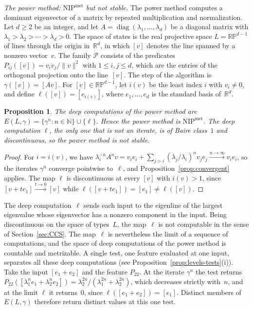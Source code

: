 \documentclass[psamsfonts]{amsart}
\newtheorem{prop}[thm]{Proposition}
\theoremstyle{definition}
\theoremstyle{remark}
\newcommand{\NIP}{\text{NIP}}
\newcommand{\RP}{\mathbb{R}\mathbb{P}}
\numberwithin{equation}{section}
\begin{document}
\emph{The power method: $\NIP^{\mathrm{met}}$ but not stable.}
The power method computes a dominant eigenvector of a matrix by repeated multiplication and normalization.
Let $d\ge2$ be an integer, and let $A=\operatorname{diag}(\lambda_1,\dots,\lambda_d)$ be a diagonal matrix with $\lambda_1>\lambda_2>\cdots>\lambda_d>0$.
The space of states is the real projective space $L=\RP^{d-1}$ of lines through the origin in~$\mathbb{R}^d$, in which $[v]$ denotes the line spanned by a nonzero vector~$v$.
The family $\mathcal{P}$ consists of the predicates $P_{ij}([v])=v_iv_j/\|v\|^2$ with $1\le i,j\le d$, which are the entries of the orthogonal projection onto the line~$[v]$.
The step of the algorithm is $\gamma([v])=[Av]$.
For $[v]\in\RP^{d-1}$, let $i(v)$ be the least index $i$ with $v_i\ne0$, and define $\ell([v])=[e_{i(v)}]$, where $e_1,\dots,e_d$ is the standard basis of~$\mathbb{R}^d$.

\begin{prop}\label{prop:power}
The deep computations of the power method are
$E(L,\gamma)=\{\gamma^n:n\in\mathbb{N}\}\cup\{\ell\}$.
Hence the power method is $\NIP^{\mathrm{met}}$.
The deep computation $\ell$, the only one that is not an iterate, is of Baire class~$1$ and discontinuous, so the power method is not stable.
\end{prop}

\begin{proof}
For $i=i(v)$, we have $\lambda_i^{-n}A^nv=v_ie_i+\sum_{j>i}(\lambda_j/\lambda_i)^nv_je_j\xrightarrow{n\to\infty} v_ie_i$,
so the iterates $\gamma^n$ converge pointwise to~$\ell$, and Proposition~\ref{prop:convergent} applies.
The map $\ell$ is discontinuous at every $[v]$ with $i(v)>1$, since $[v+te_1]\xrightarrow{t\to0}[v]$
while $\ell([v+te_1])=[e_1]\ne\ell([v])$.
\end{proof}

The deep computation~$\ell$ sends each input to the eigenline of the
largest eigenvalue whose eigenvector has a nonzero component in the input.
Being discontinuous on the space of types~$L$, the map~$\ell$ is
not computable in the sense of Section~\ref{sec:CCS}.
The map~$\ell$ is nevertheless the limit of a sequence of
computations, and the space of deep computations of the power method is countable and metrizable.
A single test, one feature evaluated at one input, separates all these deep computations (see Proposition~\ref{prop:levels-tests}(i)).
Take the input $[e_1+e_2]$ and the feature $P_{22}$.
At the iterate $\gamma^n$ the test returns $P_{22}([\lambda_1^ne_1+\lambda_2^ne_2])=\lambda_2^{2n}/(\lambda_1^{2n}+\lambda_2^{2n})$, which decreases strictly with~$n$, and at the limit $\ell$ it returns~$0$, since $\ell([e_1+e_2])=[e_1]$.
Distinct members of $E(L,\gamma)$ therefore return distinct values at this one test.
\end{document}
